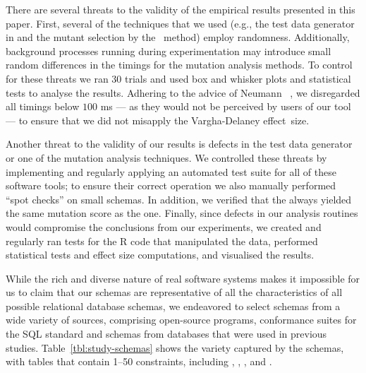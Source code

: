  There are several threats to the validity of the empirical results presented in this paper. First, several of the techniques that we used (e.g., the test data generator in \SA and the mutant selection by the \tcm~method) employ randomness. Additionally, background processes running during experimentation may introduce small random differences in the timings for the mutation analysis methods. To control for these threats we ran 30 trials and used box and whisker plots and statistical tests to analyse the results. Adhering to the advice of Neumann \etal~\cite{Neumann2015}, we disregarded all timings below $100$ ms --- as they would not be perceived by users of our tool --- to ensure that we did not misapply the Vargha-Delaney \mbox{effect size}.



Another threat to the validity of our results is defects in the test data generator or one of the mutation analysis techniques. We controlled these threats by implementing and regularly applying an automated test suite for all of these software tools; to ensure their correct operation we also manually performed ``spot checks'' on small schemas. In addition, we verified that the \vma always yielded the same mutation score as the \Original one. Finally, since defects in our analysis routines would compromise the conclusions from our experiments, we created and regularly ran tests for the R code that manipulated the data, performed statistical tests and effect size computations, and visualised the results.


While the rich and diverse nature of real software systems makes it impossible for us to claim that our schemas are representative of all the characteristics of all possible relational database schemas, we endeavored to select schemas from a wide variety of sources, comprising open-source programs, conformance suites for the SQL standard and schemas from databases that were used in previous studies. Table~\ref{tbl:study-schemas} shows the variety captured by the schemas, with tables that contain 1--50 constraints, including \CHECKs, \FKs, \PKs, \NOTNULLs and \UNIQUEs.
